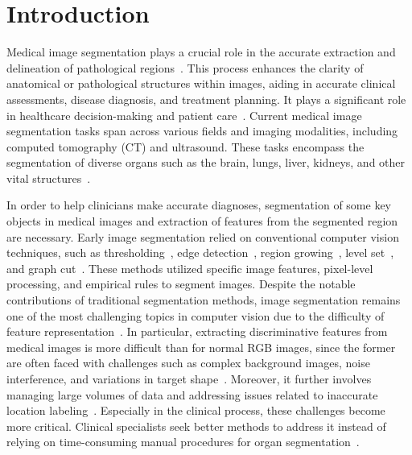 \documentclass[review]{elsarticle}
\begin{document}
	\section{Introduction}
	Medical image segmentation plays a crucial role in the accurate extraction and delineation of pathological regions~\cite{iglesias2015multi}. This process enhances the clarity of anatomical or pathological structures within images, aiding in accurate clinical assessments, disease diagnosis, and treatment planning. It plays a significant role in healthcare decision-making and patient care~\cite{duncan2000Medical}. Current medical image segmentation tasks span across various fields and imaging modalities, including computed tomography (CT) and ultrasound. These tasks encompass the segmentation of diverse organs such as the brain, lungs, liver, kidneys, and other vital structures~\cite{shen2017deep,salpea2022medical,antonelli2022medical}.

	In order to help clinicians make accurate diagnoses, segmentation of some key objects in medical images and extraction of features from the segmented region are necessary. Early image segmentation relied on conventional computer vision techniques, such as thresholding~\cite{zhang2006adaptive, senthilkumaran2016image}, edge detection~\cite{chalana1997methodology,mehena2013medical}, region growing~\cite{justice1997medical}, level set~\cite{li2012new}, and graph cut~\cite{boykov2006graph,manoharan2020improved}. These methods utilized specific image features, pixel-level processing, and empirical rules to segment images. Despite the notable contributions of traditional segmentation methods, image segmentation remains one of the most challenging topics in computer vision due to the difficulty of feature representation~\cite{wang2022medical}. In particular, extracting discriminative features from medical images is more difficult than for normal RGB images, since the former are often faced with challenges such as complex background images, noise interference, and variations in target shape~\cite{pham2000current}. Moreover, it further involves managing large volumes of data and addressing issues related to inaccurate location labeling~\cite{hesamian2019deep,scholl2011challenges}. Especially in the clinical process, these challenges become more critical. Clinical specialists seek better methods to address it instead of relying on time-consuming manual procedures for organ segmentation~\cite{mccrindle2021radiology}.
\end{document}
